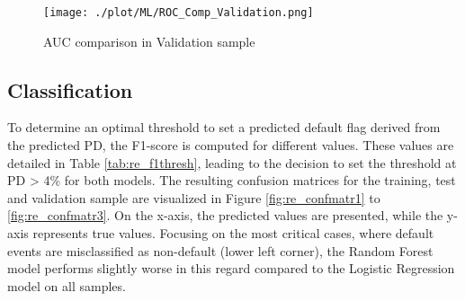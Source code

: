 \begin{figure}[H]
	\centering
	\texttt{[image: ./plot/ML/ROC\_Comp\_Validation.png]}
    \caption{AUC comparison in Validation sample}
    \label{fig:re_roc2}
\end{figure}

\subsection{Classification}
To determine an optimal threshold to set a predicted default flag derived from the predicted PD, the F1-score is computed for different values. These values are detailed in Table \ref{tab:re_f1thresh}, leading to the decision to set the threshold at PD > 4\% for both models. The resulting confusion matrices for the training, test and validation sample are visualized in Figure \ref{fig:re_confmatr1} to \ref{fig:re_confmatr3}. On the x-axis, the predicted values are presented, while the y-axis represents true values. Focusing on the most critical cases, where default events are misclassified as non-default (lower left corner), the Random Forest model performs slightly worse in this regard compared to the Logistic Regression model on all samples.

